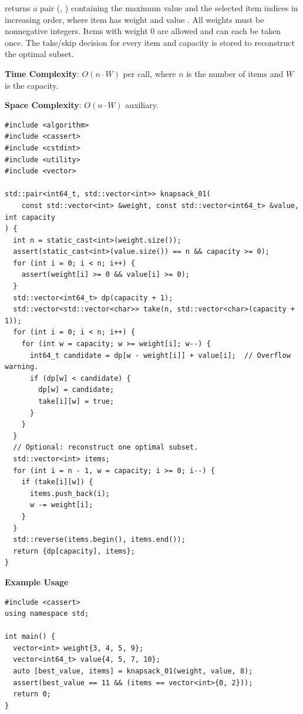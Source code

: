 \begin{compactitem}
  \item {} returns a pair (, ) containing the maximum value and the selected item indices in increasing order, where item  has weight  and value . All weights must be nonnegative integers. Items with weight $0$ are allowed and can each be taken once. The take/skip decision for every item and capacity is stored to reconstruct the optimal subset.
\end{compactitem}

\textbf{Time Complexity}: $O(n \cdot W)$ per call, where $n$ is the number of items and $W$ is the capacity.

\textbf{Space Complexity}: $O(n \cdot W)$ auxiliary.

\begin{lstlisting}[style=cpp]
#include <algorithm>
#include <cassert>
#include <cstdint>
#include <utility>
#include <vector>

std::pair<int64_t, std::vector<int>> knapsack_01(
    const std::vector<int> &weight, const std::vector<int64_t> &value, int capacity
) {
  int n = static_cast<int>(weight.size());
  assert(static_cast<int>(value.size()) == n && capacity >= 0);
  for (int i = 0; i < n; i++) {
    assert(weight[i] >= 0 && value[i] >= 0);
  }
  std::vector<int64_t> dp(capacity + 1);
  std::vector<std::vector<char>> take(n, std::vector<char>(capacity + 1));
  for (int i = 0; i < n; i++) {
    for (int w = capacity; w >= weight[i]; w--) {
      int64_t candidate = dp[w - weight[i]] + value[i];  // Overflow warning.
      if (dp[w] < candidate) {
        dp[w] = candidate;
        take[i][w] = true;
      }
    }
  }
  // Optional: reconstruct one optimal subset.
  std::vector<int> items;
  for (int i = n - 1, w = capacity; i >= 0; i--) {
    if (take[i][w]) {
      items.push_back(i);
      w -= weight[i];
    }
  }
  std::reverse(items.begin(), items.end());
  return {dp[capacity], items};
}
\end{lstlisting}
\textbf{Example Usage}\par
\begin{lstlisting}[style=cpp]
#include <cassert>
using namespace std;

int main() {
  vector<int> weight{3, 4, 5, 9};
  vector<int64_t> value{4, 5, 7, 10};
  auto [best_value, items] = knapsack_01(weight, value, 8);
  assert(best_value == 11 && (items == vector<int>{0, 2}));
  return 0;
}
\end{lstlisting}
